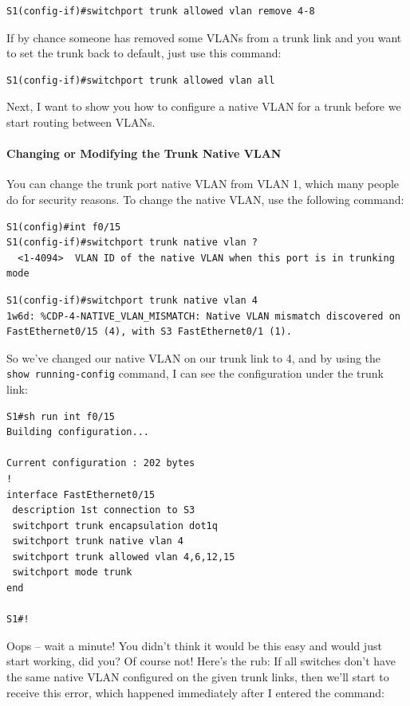 \documentclass[b5paper,11pt]{memoir}
\begin{document}
\begin{verbatim}
S1(config-if)#switchport trunk allowed vlan remove 4-8
\end{verbatim}

If by chance someone has removed some VLANs from a trunk link and you
want to set the trunk back to default, just use this command:

\begin{verbatim}
S1(config-if)#switchport trunk allowed vlan all
\end{verbatim}

Next, I want to show you how to configure a native VLAN for a trunk
before we start routing between VLANs.

\paragraph{Changing or Modifying the Trunk Native VLAN}

You can change the trunk port native VLAN from VLAN 1, which many people
do for security reasons. To change the native VLAN, use the following
command:

\begin{verbatim}
S1(config)#int f0/15
S1(config-if)#switchport trunk native vlan ?
  <1-4094>  VLAN ID of the native VLAN when this port is in trunking mode
\end{verbatim}

\begin{verbatim}
S1(config-if)#switchport trunk native vlan 4
1w6d: %CDP-4-NATIVE_VLAN_MISMATCH: Native VLAN mismatch discovered on FastEthernet0/15 (4), with S3 FastEthernet0/1 (1).
\end{verbatim}

So we've changed our native VLAN on our trunk link to 4, and by using
the \texttt{show\ running-config} command, I can see the configuration
under the trunk link:

\begin{verbatim}
S1#sh run int f0/15
Building configuration...
 
Current configuration : 202 bytes
!
interface FastEthernet0/15
 description 1st connection to S3
 switchport trunk encapsulation dot1q
 switchport trunk native vlan 4
 switchport trunk allowed vlan 4,6,12,15
 switchport mode trunk
end
 
S1#!
\end{verbatim}

Oops -- wait a minute!
You didn't think it would be this easy and would just start working, did
you? Of course not! Here's the rub: If all switches don't have the same
native VLAN configured on the given trunk links, then we'll start to
receive this error, which happened immediately after I entered the
command:
\end{document}
